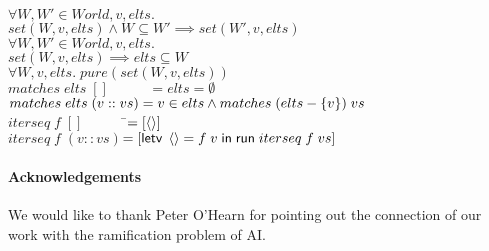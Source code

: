 \begin{tabbing}
$\forall W, W' \in World, v, elts.$ \\
\>$set(W,v,elts) \land W \subseteq W' \implies set(W',v, elts)$\\[1em]

$\forall W, W' \in World, v, elts.$ \\
\>$set(W, v, elts) \implies elts \subseteq W$ \\[1em]

$\forall W, v, elts.\; pure(set(W,v,elts))$ \\[1em]
  

$matches\;elts\;[] \qquad\;\;\; = elts = \emptyset$ \\
$matches\;elts\;(v :: vs) = v \in elts \land matches\;(elts - \{{v}\})\;vs$\\[1em]

$iterseq\; f\; [] \qquad\;\;\;\;$\=$= [\left<\right>]$ \\
$iterseq\; f\; (v :: vs)$\>$= [\mathsf{letv}\;\left<\right> = f\;v\;\mathsf{in}\;\mathsf{run}\;iterseq\;f\;vs]$ \\
\end{tabbing}


\paragraph{Acknowledgements}

We would like to thank Peter O'Hearn for pointing out the connection
of our work with the ramification problem of AI.

